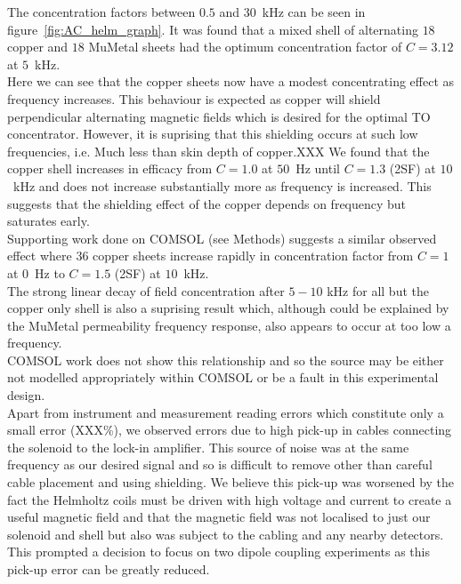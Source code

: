 \documentclass[11pt]{iopart}
\begin{document}
The concentration factors between $0.5$ and $30$~kHz can be seen in
figure~\ref{fig:AC_helm_graph}. It was found that a mixed shell of
alternating $18$ copper and $18$ MuMetal sheets had the optimum
concentration factor of $C = 3.12$ at $5$~kHz.\\ Here we can see that
the copper sheets now have a modest concentrating effect as frequency
increases. This behaviour is expected as copper will shield
perpendicular alternating magnetic fields which is desired for the
optimal TO concentrator. However, it is suprising that this shielding
occurs at such low frequencies, i.e. Much less than skin depth of
copper.XXX
We found that the copper shell increases in efficacy from $C = 1.0$ at
$50$~Hz until $C = 1.3$ (2SF) at $10$~kHz and does not increase
substantially more as frequency is increased. This suggests that the
shielding effect of the copper depends on frequency but saturates
early.\\ Supporting work done on COMSOL (see Methods) suggests a similar observed
effect where 36 copper sheets increase rapidly in concentration factor
from $C = 1$ at $0$~Hz to $C = 1.5$ (2SF) at $10$~kHz.\\

The strong linear decay of field concentration after $5-10$ kHz for
all but the copper only shell is also a suprising result which,
although could be explained by the MuMetal permeability frequency
response, also appears to occur at too low a frequency.\\ COMSOL work
does not show this relationship and so the source may be either not
modelled appropriately within COMSOL or be a fault in this
experimental design.\\

Apart from instrument and measurement reading errors which constitute
only a small error (XXX\%), we observed errors due to high pick-up in
cables connecting the solenoid to the lock-in amplifier. This source
of noise was at the same frequency as our desired signal and so is
difficult to remove other than careful cable placement and using
shielding. We believe this pick-up was worsened by the fact the
Helmholtz coils must be driven with high voltage and current to
create a useful magnetic field and that the magnetic field was not
localised to just our solenoid and shell but also was subject to the
cabling and any nearby detectors. This prompted a decision to focus on
two dipole coupling experiments as this pick-up error can be greatly
reduced.\\
\end{document}
